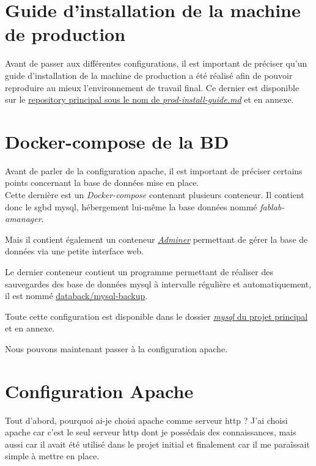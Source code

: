 \documentclass[
    iai, %
    il, %
]{heig-tb}
\begin{document}
\section{Guide d'installation de la machine de production}
Avant de passer aux différentes configurations, il est important de préciser qu'un guide d'installation de la machine de production a été réalisé afin de pouvoir reproduire au mieux l'environnement de travail final. Ce dernier est disponible sur le
\href{https://github.com/heig-fablab/fablab-manager/blob/main/prod-install-guide.md}{\Gls{repository} principal sous le nom de \emph{prod-install-guide.md}} et en annexe.

\section{Docker-compose de la BD}
Avant de parler de la configuration \Gls{apache}, il est important de préciser certains points concernant la base de données mise en place. \\
Cette dernière est un \emph{Docker-compose} contenant plusieurs \Gls{conteneur}. Il contient donc le \Gls{sgbd} \Gls{mysql}, hébergement lui-même la base données nommé \emph{fablab-amanager}.

Mais il contient également un \Gls{conteneur} \href{https://www.adminer.org/}{\emph{Adminer}} permettant de gérer la base de données via une petite interface web.

Le dernier \Gls{conteneur} contient un programme permettant de réaliser des sauvegardes des base de données \Gls{mysql} à intervalle régulière et automatiquement, il est nommé \href{https://hub.docker.com/r/databack/mysql-backup}{databack/mysql-backup}.

Toute cette configuration est disponible dans le dossier \href{https://github.com/heig-fablab/fablab-manager/blob/main/mysql/docker-compose.yml}{\emph{mysql} du projet principal} et en annexe.

Nous pouvons maintenant passer à la configuration \Gls{apache}.

\section{Configuration Apache}
Tout d'abord, pourquoi ai-je choisi \Gls{apache} comme serveur \Gls{http} ?
J'ai choisi \Gls{apache} car c'est le seul serveur \Gls{http} dont je possédais des connaissances, mais aussi car il avait été utilisé dans le projet initial et finalement car il me paraîssait simple à mettre en place.
\end{document}
